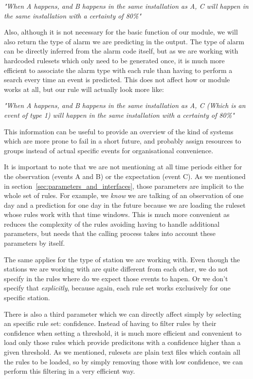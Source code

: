 \documentclass[a4paper,12pt]{article}
\begin{document}
\emph{"When A happens, and B happens in the same installation as A, C will happen in the same installation with a certainty of 80\%"}

Also, although it is not necessary for the basic function of our module, we will also return the type of alarm we are predicting in the output. The type of alarm can be directly inferred from the alarm code itself, but as we are working with hardcoded rulesets which only need to be generated once, it is much more efficient to associate the alarm type with each rule than having to perform a search every time an event is predicted. This does not affect how or module works at all, but our rule will actually look more like:

\emph{"When A happens, and B happens in the same installation as A, C (Which is an event of type 1) will happen in the same installation with a certainty of 80\%"}

This information can be useful to provide an overview of the kind of systems which are more prone to fail in a short future, and probably assign resources to groups instead of actual specific events for organisational convenience.

It is important to note that we are not mentioning at all time periods either for the observation (events A and B) or the expectation (event C). As we mentioned in section~\ref{sec:parameters_and_interfaces}, those parameters are implicit to the whole set of rules. For example, we \emph{know} we are talking of an observation of one day and a prediction for one day in the future because we are loading the ruleset whose rules work with that time windows. This is much more convenient as reduces the complexity of the rules avoiding having to handle additional parameters, but needs that the calling process takes into account these parameters by itself.

The same applies for the type of station we are working with. Even though the stations we are working with are quite different from each other, we do not specify in the rules where do we expect those events to hapen. Or we don't specify that \emph{explicitly}, because again, each rule set works exclusively for one specific station.

There is also a third parameter which we can directly affect simply by selecting an specific rule set: confidence. Instead of having to filter rules by their confidence when setting a threshold, it is much more efficient and convenient to load only those rules which provide predicitons with a confidence higher than a given threshold. As we mentioned, rulesets are plain text files which contain all the rules to be loaded, so by simply removing those with low confidence, we can perform this filtering in a very efficient way.
\end{document}
